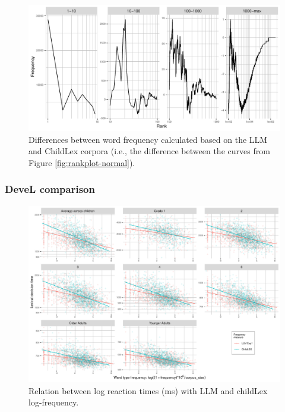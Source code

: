 \documentclass[doc, a4paper]{apa7}
\begin{document}
\begin{figure}[!htbp]
    \centering
    \includegraphics[width=\textwidth]{figures/rankplot-difs-3.5-2.pdf}
    \caption{Differences between word frequency calculated based on the LLM and ChildLex corpora (i.e., the difference between the curves from Figure \ref{fig:rankplot-normal}).}
    \label{fig:rankplot-difs}
\end{figure}

\clearpage


\subsubsection{DeveL comparison}

\begin{figure}[!htbp]
    \centering
    \includegraphics[width=\textwidth]{figures/exp18plus1-log.pdf}
    \caption{Relation between log reaction times (ms) with LLM and childLex log-frequency.}
\label{fig:rt-f-scatter}
\end{figure}
\end{document}
